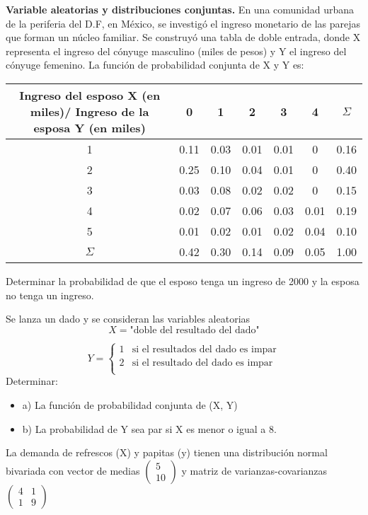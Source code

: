 \documentclass{oxmathproblems}
\begin{document}
\begin{questions}

\miquestion \textbf {Variable aleatorias y distribuciones conjuntas.} En una comunidad urbana de la periferia del D.F, en México, se investigó el ingreso monetario de las parejas que forman un núcleo familiar. Se construyó una tabla de doble entrada, donde X representa el ingreso del cónyuge masculino (miles de pesos) y Y el ingreso del cónyuge femenino. 
La función de probabilidad conjunta de X y Y es: 

\begin{center}
\begin{tabular}{ |c|c|c|c|c|c|c| } 
\hline
Ingreso del esposo X (en miles)/ Ingreso de la esposa Y (en miles) & 0 & 1 & 2 & 3 & 4 & $\varSigma$ \\
\hline
1 & 0.11 & 0.03 & 0.01 & 0.01 & 0 & 0.16 \\
2 & 0.25 & 0.10 & 0.04 & 0.01 & 0 & 0.40 \\
3 & 0.03 & 0.08 & 0.02 & 0.02 & 0 & 0.15 \\
4 & 0.02 & 0.07 & 0.06 & 0.03 & 0.01 & 0.19  \\
5 & 0.01 & 0.02 & 0.01 & 0.02 & 0.04 & 0.10  \\
$\varSigma$ & 0.42 & 0.30 & 0.14 & 0.09 & 0.05 & 1.00  \\
\hline
\end{tabular}
\end{center}

Determinar la probabilidad de que el esposo tenga un ingreso de 2000 y la esposa no tenga un ingreso. 

\miquestion Se lanza un dado y se consideran las variables aleatorias
 $$ X = \text{"doble del resultado del dado"} $$
 
 \[   
Y = 
     \begin{cases}
       1 &  \text{si el resultados del dado es impar}\\
       2 & \text{si el resultado del dado es impar} \\
     \end{cases}
\]
$$$$
Determinar: 
\begin{itemize}
\item  a) La función de probabilidad conjunta de (X, Y)
\item  b) La probabilidad de Y sea par si X es menor o igual a 8. 
\end{itemize}

\miquestion La demanda de refrescos (X) y papitas (y) tienen una distribución normal bivariada con vector de medias $\begin{pmatrix}5 \\ 10 \end{pmatrix} $  y matriz de varianzas-covarianzas $\begin{pmatrix}4 & 1\\ 1 &9\end{pmatrix} $


\end{questions}
\end{document}
